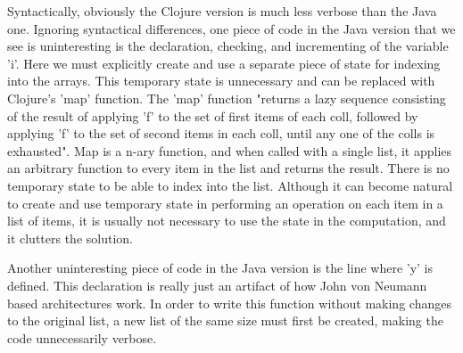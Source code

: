 Syntactically, obviously the Clojure version is much less verbose than the Java one.
Ignoring syntactical differences, one piece of code in the Java version that we see is uninteresting is the declaration,
checking, and incrementing of the variable 'i'. Here we must explicitly create and use a separate piece of state for indexing into the arrays. This temporary state is unnecessary
and can be replaced with Clojure's 'map' function. The 'map' function "returns a lazy sequence consisting of the result of applying 'f' to the
set of first items of each coll, followed by applying 'f' to the set
of second items in each coll, until any one of the colls is
exhausted". Map is a n-ary function, and when called with a single list, it applies an arbitrary function to every item in the list and returns the result. There is no 
temporary state to be able to index into the list. Although it can become natural to create and use temporary state in performing an operation on each item in a list of items,
it is usually not necessary to use the state in the computation, and it clutters the solution. 

Another uninteresting piece of code in the Java version is the line where 'y' is defined. 
This declaration is really just an artifact of how John von Neumann based architectures work. In order to write this function without making changes to 
the original list, a new list of the same size must first be created, making the code unnecessarily verbose. 

